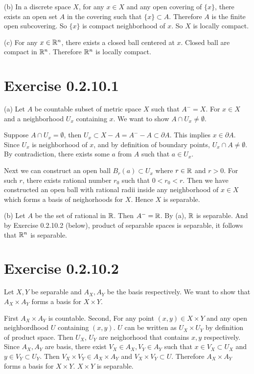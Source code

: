 \documentclass[12pt]{article}
\begin{document}
(b) In a discrete space $X$, for any $x \in X$ and any open covering of $\{x\}$, there exists an open set $A$ in the covering such that $\{x\} \subset A$. Therefore $A$ is the finite open subcovering. So $\{x\}$ is compact neighborhood of $x$. So $X$ is locally compact. \QED 

(c) For any $x \in \mathbb{R}^n$, there exists a closed ball centered at $x$. Closed ball are compact in $\mathbb{R}^n$. Therefore $\mathbb{R}^n$ is locally compact. \QED 

\section*{Exercise 0.2.10.1}
(a) Let $A$ be countable subset of metric space $X$ such that $A^- = X$. For $x \in X$ and a neighborhood $U_x$ containing $x$. We want to show $A \cap U_x \neq \emptyset$.

Suppose $A \cap U_x = \emptyset$, then $U_x \subset X - A = A^- - A \subset \partial A$. This implies $x \in \partial A$. Since $U_x$ is neighborhood of $x$, and by definition of boundary points, $U_x \cap A \neq \emptyset$. By contradiction, there exists some $a$ from $A$ such that $a \in U_x$.

Next we can construct an open ball $B_r(a) \subset U_x$ where $r \in \mathbb{R}$ and $r > 0$. For such $r$, there exists rational number $r_0$ such that $0 < r_0 < r$. Then we have constructed an open ball with rational radii inside any neighborhood of $x \in X$ which forms a basis of neighorhoods for $X$. Hence $X$ is separable. \QED

(b) Let $A$ be the set of rational in $\mathbb{R}$. Then $A^- = \mathbb{R}$. By (a), $\mathbb{R}$ is separable. And by Exercise 0.2.10.2 (below), product of separable spaces is separable, it follows that $\mathbb{R}^n$ is separable. \QED

\section*{Exercise 0.2.10.2}
Let $X, Y$ be separable and $A_X, A_Y$ be the basis respectively. We want to show that $A_X \times A_Y$ forms a basis for $X \times Y$.

First $A_X \times A_Y$ is countable. Second, For any point $(x,y) \in X\times Y$ and any open neighbordhood $U$ containing $(x, y)$. $U$ can be written as $U_X \times U_Y$ by definition of product space. Then $U_X$, $U_Y$ are neighorhood that contains $x, y$ respectively. Since $A_X, A_Y$ are basis, there exist $V_X \in A_X, V_Y \in A_Y$ such that $x \in V_X \subset U_X$ and $y \in V_Y \subset U_Y$. Then $V_X \times V_Y \in A_X \times A_Y$ and $V_X \times V_Y \subset U$. Therefore $A_X \times A_Y$ forms a basis for $X \times Y$. $X \times Y$ is separable. \QED
\end{document}
